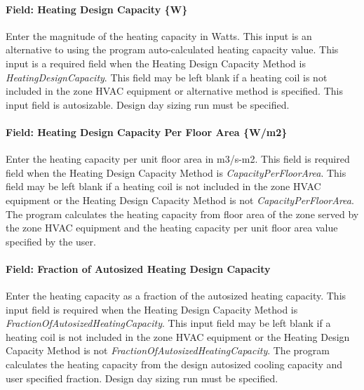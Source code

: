 \paragraph{Field: Heating Design Capacity \{W\}}\label{field-heating-design-capacity-w}

Enter the magnitude of the heating capacity in Watts. This input is an alternative to using the program auto-calculated heating capacity value. This input is a required field when the Heating Design Capacity Method is \emph{HeatingDesignCapacity}. This field may be left blank if a heating coil is not included in the zone HVAC equipment or alternative method is specified. This input field is autosizable. Design day sizing run must be specified.

\paragraph{Field: Heating Design Capacity Per Floor Area \{W/m2\}}\label{field-heating-design-capacity-per-floor-area-wm2}

Enter the heating capacity per unit floor area in m3/s-m2. This field is required field when the Heating Design Capacity Method is \emph{CapacityPerFloorArea}. This field may be left blank if a heating coil is not included in the zone HVAC equipment or the Heating Design Capacity Method is not \emph{CapacityPerFloorArea}. The program calculates the heating capacity from floor area of the zone served by the zone HVAC equipment and the heating capacity per unit floor area value specified by the user.

\paragraph{Field: Fraction of Autosized Heating Design Capacity}\label{field-fraction-of-autosized-heating-design-capacity}

Enter the heating capacity as a fraction of the autosized heating capacity. This input field is required when the Heating Design Capacity Method is \emph{FractionOfAutosizedHeatingCapacity}. This input field may be left blank if a heating coil is not included in the zone HVAC equipment or the Heating Design Capacity Method is not \emph{FractionOfAutosizedHeatingCapacity}. The program calculates the heating capacity from the design autosized cooling capacity and user specified fraction. Design day sizing run must be specified.

